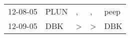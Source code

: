 \begin{supertabular}{lllll}
 12-08-05 &  PLUN &             , &             , &  peep \\
 12-09-05 &   DBK &  \textgreater &  \textgreater &   DBK \\
\end{supertabular}
